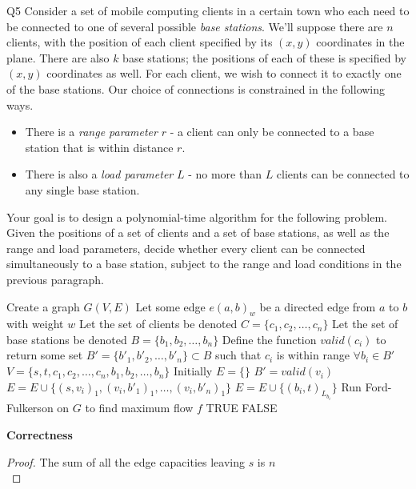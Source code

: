 \begin{problem}
  {Q5}
  Consider a set of mobile computing clients in a certain town who each need to be connected to one of several possible \textit{base stations}.
  We'll suppose there are $n$ clients, with the position of each client specified by its $(x,y)$ coordinates in the plane. There are also $k$ base stations; the positions
  of each of these is specified by $(x,y)$ coordinates as well. For each client, we wish to connect it to exactly one of the base stations. Our
  choice of connections is constrained in the following ways.\\
  \begin{itemize}
  \item There is a \textit{range parameter} $r$ - a client can only be connected to a base station that is within distance $r$.
  \item There is also a \textit{load parameter} $L$ - no more than $L$ clients can be connected to any single base station.
  \end{itemize}
  Your goal is to design a polynomial-time algorithm for the following problem. Given the positions of a set of clients and a set of base stations, as well as the range and load parameters, decide
  whether every client can be connected simultaneously to a base station, subject to the range and load conditions in the previous paragraph.
  \begin{algorithmic}[1]
    \STATE Create a graph $G(V, E)$
    \STATE Let some edge $e(a, b)_w$ be a directed edge from $a$ to $b$ with weight $w$
    \STATE Let the set of clients be denoted $C = \{c_1, c_2, \dots, c_n\}$
    \STATE Let the set of base stations be denoted $B = \{b_1, b_2, \dots, b_n\}$
    \STATE Define the function $valid(c_i)$ to return some set $B' = \{b'_1, b'_2, \dots, b'_n\} \subset B$ such that $c_i$ is within range $\forall b_i \in B'$
    \STATE $V = \{s, t, c_1, c_2, \dots, c_n, b_1, b_2, \dots, b_n\}$
    \STATE Initially $E = \{\}$
    \STATE $B' = valid(v_i)$
    \STATE $E = E \cup \{(s, v_i)_1, (v_i, b'_1)_1, \dots, (v_i, b'_n)_1\}$
    \ENDIF
    \STATE $E = E \cup \{(b_i, t)_{L_{b_i}}\}$
    \ENDIF
    \ENDFOR
    \STATE Run Ford-Fulkerson on $G$ to find maximum flow $f$
    \RETURN TRUE
    \ELSE
    \RETURN FALSE
    \ENDIF
  \end{algorithmic}
  \noindent
  \textbf{Correctness}
  \begin{proof}
      The sum of all the edge capacities leaving $s$ is $n$ \\

\end{proof}
\end{problem}
